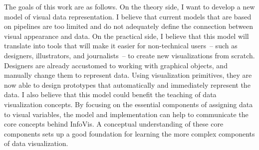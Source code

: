 The goals of this work are as follows.
On the theory side, I want to develop a new model of visual data representation.
I believe that current models that are based on pipelines are too limited and do not adequately define the connection between visual appearance and data.
On the practical side, I believe that this model will translate into tools that will make it easier for non-technical users~-- such as designers, illustrators, and journalists~-- to create new visualizations from scratch.
Designers are already accustomed to working with graphical objects, and manually change them to represent data.
Using visualization primitives, they are now able to design prototypes that automatically and immediately represent the data.
I also believe that this model could benefit the teaching of data visualization concepts.
By focusing on the essential components of assigning data to visual variables, the model and implementation can help to communicate the core concepts behind InfoVis.
A conceptual understanding of these core components sets up a good foundation for learning the more complex components of data visualization.